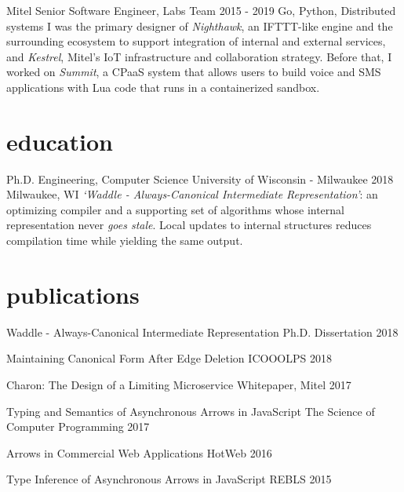 \documentclass[]{clean-resume}
\begin{document}
\detailentry
  {Mitel}
  {Senior Software Engineer, Labs Team}
  {2015 - 2019}
  {Go, Python, Distributed systems}
  {
    I was the primary designer of \emph{Nighthawk}, an IFTTT-like engine and the surrounding ecosystem to support integration of internal and external services, and \emph{Kestrel}, Mitel's IoT infrastructure and collaboration strategy. Before that, I worked on \emph{Summit}, a CPaaS system that allows users to build voice and SMS applications with Lua code that runs in a containerized sandbox.
  }

\section{education}

\detailentry
  {Ph.D. Engineering, Computer Science}
  {University of Wisconsin - Milwaukee}
  {2018}
  {Milwaukee, WI}
  {
    \emph{`Waddle - Always-Canonical Intermediate Representation'}: an optimizing compiler and a supporting set of algorithms whose internal representation never \emph{goes stale}. Local updates to internal structures reduces compilation time while yielding the same output.
  }

\section{publications}


\lineentry
  {Waddle - Always-Canonical Intermediate Representation}
  {Ph.D. Dissertation}
  {2018}

\lineentry
  {Maintaining Canonical Form After Edge Deletion}
  {ICOOOLPS}
  {2018}

\lineentry
  {Charon: The Design of a Limiting Microservice}
  {Whitepaper, Mitel}
  {2017}

\lineentry
  {Typing and Semantics of Asynchronous Arrows in JavaScript}
  {The Science of Computer Programming}
  {2017}

\lineentry
  {Arrows in Commercial Web Applications}
  {HotWeb}
  {2016}

\lineentry
  {Type Inference of Asynchronous Arrows in JavaScript}
  {REBLS}
  {2015}
\end{document}
